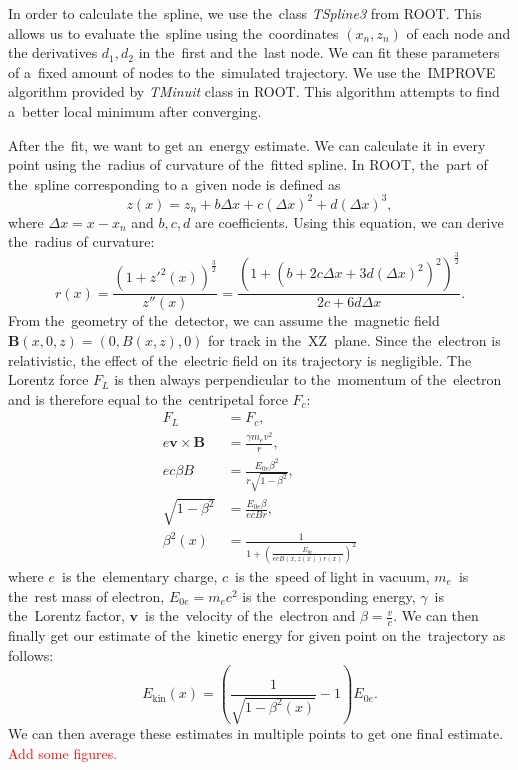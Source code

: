 		In order to calculate the~spline, we use the~class \textit{TSpline3} from ROOT. This allows us to evaluate the~spline using the~coordinates $(x_n,z_n)$ of each node and the derivatives $d_1,d_2$ in the~first and the~last node. We can fit these parameters of a~fixed amount of nodes to the~simulated trajectory. We use the~IMPROVE algorithm provided by \textit{TMinuit} class in ROOT. This algorithm attempts to find a~better local minimum after converging.
		
		After the~fit, we want to get an~energy estimate. We can calculate it in every point using the~radius of curvature of the~fitted spline. In ROOT, the~part of the~spline corresponding to a~given node is defined as
			\begin{equation}
				z(x) = z_n + b \Delta x+c(\Delta x)^2+d(\Delta x)^3,
			\end{equation}
		where $\Delta x = x-x_n$ and $b,c,d$ are coefficients. Using this equation, we can derive the~radius of curvature:
			\begin{equation}
				r(x) = \frac{\left(1+z'^2(x)\right)^\frac{3}{2}}{z''(x)} = \frac{\left(1+\left(b+2c\Delta x+3d(\Delta x)^2\right)^2\right)^\frac{3}{2}}{2c+6d\Delta x}.
			\end{equation}
		From the~geometry of the~detector, we can assume the~magnetic field $\bm{B}(x,0,z) = (0,B(x,z),0)$ for track in the~XZ~plane. Since the~electron is relativistic, the effect of the~electric field on its trajectory is negligible. The Lorentz force $F_L$ is then always perpendicular to the~momentum of the~electron and is therefore equal to the~centripetal force $F_c$:
			\begin{align}
				F_L &= F_c,\\
				e\bm{v}\times\bm{B} &= \frac{\gamma m_e v^2}{r},\\
				e c\beta B &= \frac{E_{0e} \beta^2}{r\sqrt{1-\beta^2}},\\
				\sqrt{1-\beta^2} &= \frac{E_{0e} \beta}{ecBr},\\
				\beta^2(x) &= \frac{1}{1+\left(\frac{E_{0e}}{ecB(x,z(x))r(x)}\right)^2} \label{eq:ekin1}
			\end{align}
		where $e$~is the~elementary charge, $c$~is the~speed of light in vacuum, $m_e$~is the~rest mass of electron, $E_{0e} = m_e c^2$ is the~corresponding energy, $\gamma$~is the~Lorentz factor, $\bm{v}$~is the~velocity of the~electron and $\beta = \frac{v}{c}$. We can then finally get our estimate of the~kinetic energy for given point on the~trajectory as follows:
			\begin{equation}
				\label{eq:ekin2}
				E_\text{kin}(x) = \left(\frac{1}{\sqrt{1-\beta^2(x)}}-1\right)E_{0e}.
			\end{equation}
		We can then average these estimates in multiple points to get one final estimate.
		\textcolor{red}{Add some figures.}
		
